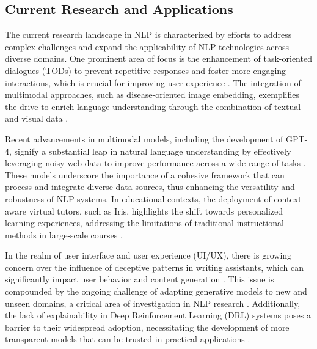 \subsection{Current Research and Applications} \label{subsec:Current Research and Applications}

The current research landscape in NLP is characterized by efforts to address complex challenges and expand the applicability of NLP technologies across diverse domains. One prominent area of focus is the enhancement of task-oriented dialogues (TODs) to prevent repetitive responses and foster more engaging interactions, which is crucial for improving user experience \cite{stricker2024enhancingtaskorienteddialogueschitchat}. The integration of multimodal approaches, such as disease-oriented image embedding, exemplifies the drive to enrich language understanding through the combination of textual and visual data \cite{arai2021diseaseorientedimageembeddingpseudoscanner}.



Recent advancements in multimodal models, including the development of GPT-4, signify a substantial leap in natural language understanding by effectively leveraging noisy web data to improve performance across a wide range of tasks . These models underscore the importance of a cohesive framework that can process and integrate diverse data sources, thus enhancing the versatility and robustness of NLP systems. In educational contexts, the deployment of context-aware virtual tutors, such as Iris, highlights the shift towards personalized learning experiences, addressing the limitations of traditional instructional methods in large-scale courses \cite{bassner2024irisaidrivenvirtualtutor}.



In the realm of user interface and user experience (UI/UX), there is growing concern over the influence of deceptive patterns in writing assistants, which can significantly impact user behavior and content generation \cite{benharrak2024deceptivepatternsintelligentinteractive}. This issue is compounded by the ongoing challenge of adapting generative models to new and unseen domains, a critical area of investigation in NLP research \cite{park2023domainadaptationbasedhuman}. Additionally, the lack of explainability in Deep Reinforcement Learning (DRL) systems poses a barrier to their widespread adoption, necessitating the development of more transparent models that can be trusted in practical applications \cite{qing2023surveyexplainablereinforcementlearning}.



